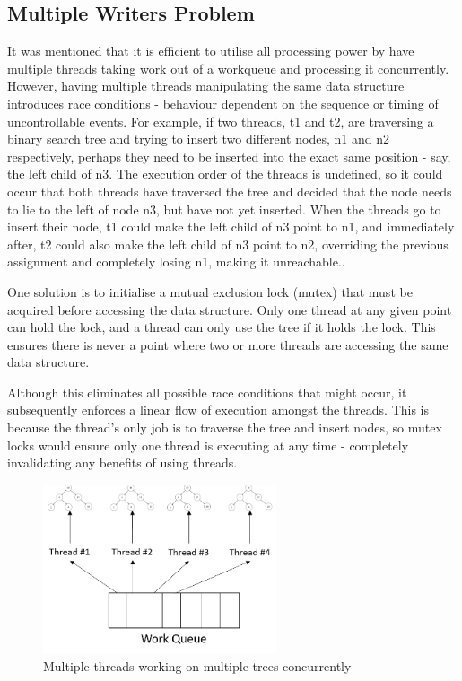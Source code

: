 \documentclass[12pt,twoside]{article}
\begin{document}
\subsection{Multiple Writers Problem}

It was mentioned that it is efficient to utilise all processing power by have multiple threads taking work out of a workqueue and processing it concurrently. However, having multiple threads manipulating the same data structure introduces race conditions - behaviour dependent on the sequence or timing of uncontrollable events. For example, if two threads, t1 and t2, are traversing a binary search tree and trying to insert two different nodes, n1 and n2 respectively, perhaps they need to be inserted into the exact same position - say, the left child of n3. The execution order of the threads is undefined, so it could occur that both threads have traversed the tree and decided that the node needs to lie to the left of node n3, but have not yet inserted. When the threads go to insert their node, t1 could make the left child of n3 point to n1, and immediately after, t2 could also make the left child of n3 point to n2, overriding the previous assignment and completely losing n1, making it unreachable.. 

One solution is to initialise a mutual exclusion lock (mutex) that must be acquired before accessing the data structure. Only one thread at any given point can hold the lock, and a thread can only use the tree if it holds the lock. This ensures there is never a point where two or more threads are accessing the same data structure.

Although this eliminates all possible race conditions that might occur, it subsequently enforces a linear flow of execution amongst the threads. This is because the thread's only job is to traverse the tree and insert nodes, so mutex locks would ensure only one thread is executing at any time - completely invalidating any benefits of using threads.

\begin{figure}[h]
	\begin{center}
		\includegraphics[height=5cm]{figures/trees}
	\end{center}
	\caption{Multiple threads working on multiple trees concurrently}
	\label{figure_trees} 
\end{figure}
\end{document}
